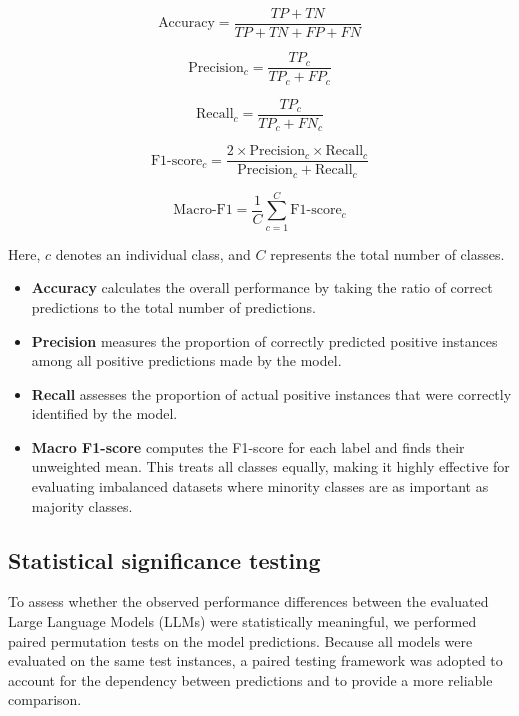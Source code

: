 \documentclass[10pt,letterpaper]{article}
\begin{document}
\begin{equation}
\text{Accuracy} = \frac{TP + TN}{TP + TN + FP + FN}
\label{eq:accuracy}
\end{equation}

\begin{equation}
\text{Precision}_c = \frac{TP_c}{TP_c + FP_c}
\label{eq:precision}
\end{equation}

\begin{equation}
\text{Recall}_c = \frac{TP_c}{TP_c + FN_c}
\label{eq:recall}
\end{equation}

\begin{equation}
\text{F1-score}_c = \frac{2 \times \text{Precision}_c \times \text{Recall}_c}{\text{Precision}_c + \text{Recall}_c}
\label{eq:f1score}
\end{equation}

\begin{equation}
\text{Macro-F1} = \frac{1}{C} \sum_{c=1}^{C} \text{F1-score}_c
\label{eq:macro_f1}
\end{equation}

\noindent
Here, \(c\) denotes an individual class, and \(C\) represents the total number of classes. 
\begin{itemize}
    \item \textbf{Accuracy} calculates the overall performance by taking the ratio of correct predictions to the total number of predictions.
    \item \textbf{Precision} measures the proportion of correctly predicted positive instances among all positive predictions made by the model.
    \item \textbf{Recall} assesses the proportion of actual positive instances that were correctly identified by the model.
    \item \textbf{Macro F1-score} computes the F1-score for each label and finds their unweighted mean. This treats all classes equally, making it highly effective for evaluating imbalanced datasets where minority classes are as important as majority classes.
\end{itemize}



\subsection*{Statistical significance testing}
\label{sec:statistical_significance}

To assess whether the observed performance differences between the evaluated Large Language Models (LLMs) were statistically meaningful, we performed paired permutation tests on the model predictions. Because all models were evaluated on the same test instances, a paired testing framework was adopted to account for the dependency between predictions and to provide a more reliable comparison.
\end{document}
